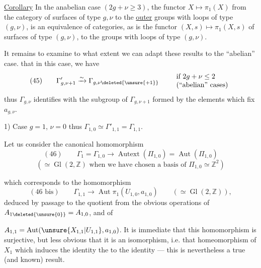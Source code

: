 \uline{Corollary} In the anabelian case $(2g+\nu\geq3)$, the functor $X\longmapsto\pi_1(X)$ from the  category of surfaces of type $g,\nu$ to the \uline{outer} groups with loops of type $(g,\nu)$, is an equivalence of categories, as is the functor $(X,s)\longmapsto\pi_1(X,s)$  of  surfaces of type $(g,\nu)$, to the groups with loops of type $(g,\nu)$.


It remains to examine to what extent we can adapt these results to the ``abelian'' case.   that in this case, we have
\[
(45)\qquad \Gamma'_{g,\nu+1}\xrightarrow{\sim}\Gamma_{g,\nu\deleted{\unsure{+1}}}
\qquad\begin{array}{l}
\text{if }2g+\nu\leq2\\
\text{(``abelian'' cases)}
\end{array}
\]
thus $\Gamma_{g,\nu}$ identifies with the subgroup of $\Gamma_{g,\nu+1}$ formed by the elements which fix $a_{g,\nu}$.

1) Case $g=1$, $\nu=0$ thus $\Gamma_{1,0}\simeq\Gamma'_{1,1}=\Gamma_{1,1}$.

Let us consider the canonical homomorphism
\[
(46)\qquad \Gamma_1=\Gamma_{1,0}\longrightarrow\operatorname{Autext}(\Pi_{1,0})=\operatorname{Aut}(\Pi_{1,0})
\]
\[
(\simeq\operatorname{Gl}(2,\mathbb{Z})\text{ when we have chosen a basis of }\Pi_{1,0}\simeq\mathbb{Z}^2)
\]

which corresponds to the homomorphism
\[
(46\text{ bis})\qquad\Gamma_{1,1}\longrightarrow\operatorname{Aut}\pi_1(U_{1,0},a_{1,0})
\qquad(\simeq\operatorname{Gl}(2,\mathbb{Z})),
\]
deduced  by passage to the quotient from the  obvious operations of $A_{1\deleted{\unsure{0}}}=A_{1,0}$, and of

$A_{1,1}=\operatorname{Aut}(\unsure{X_{1,1}|U_{1,1}},a_{1,0})$.
It is immediate that this homomorphism is surjective, but less obvious that it is an isomorphism, i.e. that  homeomorphism of $X_1$ which induces the identity  the    to the identity --- this is nevertheless a true (and known) result.

